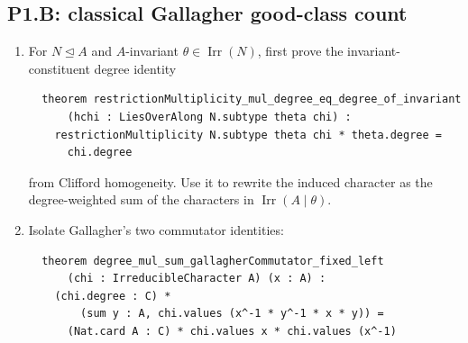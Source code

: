 \documentclass[11pt]{article}
\newcommand{\Irr}{\operatorname{Irr}}
\begin{document}
\subsection{P1.B: classical Gallagher good-class count}

\begin{enumerate}[label=\textbf{P1.B\arabic*.},leftmargin=*]
  \item For \(N\trianglelefteq A\) and \(A\)-invariant
  \(\theta\in\Irr(N)\), first prove the invariant-constituent degree
  identity
  \begin{lstlisting}
  theorem restrictionMultiplicity_mul_degree_eq_degree_of_invariant
      (hchi : LiesOverAlong N.subtype theta chi) :
    restrictionMultiplicity N.subtype theta chi * theta.degree =
      chi.degree
  \end{lstlisting}
  from Clifford homogeneity.  Use it to rewrite the induced character as
  the degree-weighted sum of the characters in
  \(\Irr(A\mid\theta)\).
  \item Isolate Gallagher's two commutator identities:
  \begin{lstlisting}
  theorem degree_mul_sum_gallagherCommutator_fixed_left
      (chi : IrreducibleCharacter A) (x : A) :
    (chi.degree : C) *
        (sum y : A, chi.values (x^-1 * y^-1 * x * y)) =
      (Nat.card A : C) * chi.values x * chi.values (x^-1)


\end{lstlisting}
\end{enumerate}
\end{document}
